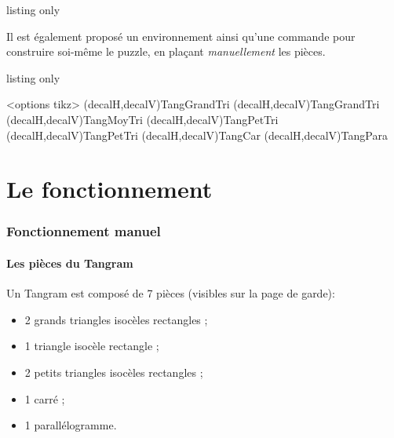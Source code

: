 \documentclass{article}
\begin{document}
\begin{PresentationCode}{listing only}
\end{PresentationCode}

Il est également proposé un \textsf{environnement} ainsi qu'une \textsf{commande} pour construire soi-même le puzzle, en plaçant \textit{manuellement} les pièces.

\begin{PresentationCode}{listing only}
\begin{EnvTangramTikz}[clés]<options tikz>
	(decalH,decalV){TangGrandTri}
	(decalH,decalV){TangGrandTri}
	(decalH,decalV){TangMoyTri}
	(decalH,decalV){TangPetTri}
	(decalH,decalV){TangPetTri}
	(decalH,decalV){TangCar}
	(decalH,decalV){TangPara}
\end{EnvTangramTikz}
\end{PresentationCode}

\pagebreak

\part{Le fonctionnement}

\section{Fonctionnement \og manuel \fg}

\subsection{Les pièces du Tangram}

Un Tangram est composé de 7 pièces (visibles sur la page de garde):

\begin{itemize}
	\item 2 grands triangles isocèles rectangles ;
	\item 1 triangle isocèle rectangle ;
	\item 2 petits triangles isocèles rectangles ;
	\item 1 carré ;
	\item 1 parallélogramme.
\end{itemize}
\end{document}
